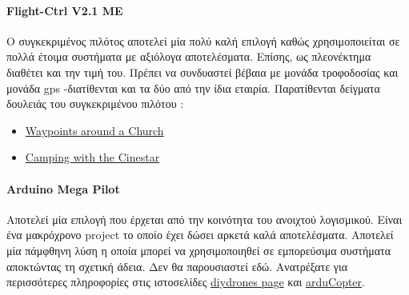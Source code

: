\documentclass[a4paper, 12pt, twoside]{report}
\begin{document}
{{{{{{			\paragraph{Flight-Ctrl V2.1 ME}{Ο συγκεκριμένος πιλότος αποτελεί μία πολύ καλή επιλογή καθώς χρησιμοποιείται σε πολλά έτοιμα συστήματα με αξιόλογα αποτελέσματα. Επίσης, ως πλεονέκτημα διαθέτει και την τιμή του. Πρέπει να συνδυαστεί βέβαια με μονάδα τροφοδοσίας και μονάδα gps -διατίθενται και τα δύο από την ίδια εταιρία. Παρατίθενται δείγματα δουλειάς του συγκεκριμένου πιλότου :
				\begin{itemize}
					\item \href{https://vimeo.com/39145829}{Waypoints around a Church}
					\item \href{https://vimeo.com/37653065}{Camping with the Cinestar}
				\end{itemize}
			}
			
			\paragraph{Arduino Mega Pilot}{Αποτελεί μία επιλογή που έρχεται από την κοινότητα του ανοιχτού λογισμικού. Είναι ένα μακρόχρονο project το οποίο έχει δώσει αρκετά καλά αποτελέσματα. Αποτελεί μία πάμφθηνη λύση η οποία μπορεί να χρησιμοποιηθεί σε εμπορεύσιμα συστήματα αποκτώντας τη σχετική άδεια. Δεν θα παρουσιαστεί εδώ. Ανατρέξατε για περισσότερες πληροφορίες στις ιστοσελίδες \href{http://www.diydrones.com/notes/ArduPilot}{diydrones page} και \href{http://code.google.com/p/arducopter/}{arduCopter}.
			}
			
			\begin{landscape}	
			\setlength\LTleft{0pt}            %
			\setlength\LTright{0pt}           %
	

\end{landscape}}}}}}}
\end{document}
